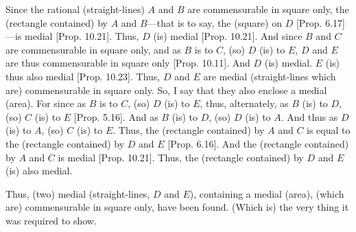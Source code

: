 \begin{Parallel}{}{}
{Since the rational (straight-lines) $A$ and $B$ are commensurable in square only, the (rectangle contained) by $A$ and $B$---that is to say, the
(square) on $D$ [Prop. 6.17]---is medial
[Prop. 10.21]. Thus, $D$ (is) medial [Prop. 10.21]. And
since $B$ and $C$ are commensurable in square only, and as $B$ is to $C$, (so) $D$ (is) to $E$, $D$ and $E$ are thus commensurable in square
only [Prop. 10.11]. And $D$ (is) medial.
$E$ (is) thus also medial [Prop. 10.23].
Thus, $D$ and $E$ are medial (straight-lines which are) commensurable
in square only. So, I say that they also enclose a medial (area). For since
as $B$ is to $C$, (so) $D$ (is) to $E$, thus, alternately, as $B$ (is) to $D$,
(so) $C$ (is) to $E$ [Prop. 5.16]. And as
$B$ (is) to $D$, (so) $D$ (is) to $A$. And thus as $D$ (is) to $A$, (so)
$C$ (is) to $E$. Thus, the (rectangle contained) by $A$ and $C$ is equal
to the (rectangle contained) by $D$ and $E$ [Prop. 6.16]. And the (rectangle contained) by 
$A$ and $C$ is medial [Prop. 10.21]. Thus, the (rectangle contained) by $D$ and $E$ (is)
also medial.

Thus, (two) medial (straight-lines, $D$ and $E$), containing a medial (area),
(which are) commensurable in square only, have been found. (Which is)
the very thing it was required to show.}
\end{Parallel}



